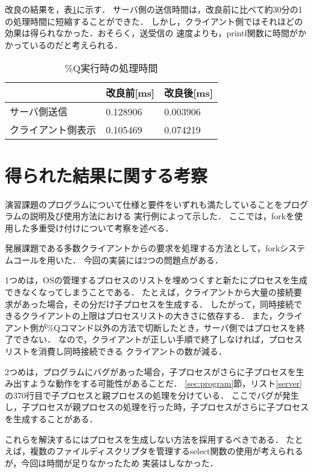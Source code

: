 \documentclass[11pt]{jarticle}
\begin{document}
改良の結果を，表\ref{table:Q}に示す．
サーバ側の送信時間は，改良前に比べて約30分の1の処理時間に短縮することができた．
しかし，クライアント側ではそれほどの効果は得られなかった．おそらく，送受信の
速度よりも，printf関数に時間がかかっているのだと考えられる．

\begin{table}[h] \caption{\%Q実行時の処理時間} \label{table:Q}
    \begin{center}
        \begin{tabular}{l|l|l} \hline
             & 改良前[ms] & 改良後[ms] \\ \hline \hline
            サーバ側送信 & 0.128906 & 0.003906 \\ 
            クライアント側表示 & 0.105469 & 0.074219 \\ 
        \end{tabular}
    \end{center}
\end{table}

\section{得られた結果に関する考察}

演習課題のプログラムについて仕様と要件をいずれも満たしていることをプログラムの説明及び使用方法における
実行例によって示した．
ここでは，forkを使用した多重受け付けについて考察を述べる．

発展課題である多数クライアントからの要求を処理する方法として，forkシステムコールを用いた．
今回の実装には2つの問題点がある．

1つめは，OSの管理するプロセスのリストを埋めつくすと新たにプロセスを生成できなくなってしまうことである．
たとえば，クライアントから大量の接続要求があった場合，その分だけ子プロセスを生成する．
したがって，同時接続できるクライアントの上限はプロセスリストの大きさに依存する．
また，クライアント側が\%Qコマンド以外の方法で切断したとき，サーバ側ではプロセスを終了できない．
なので，クライアントが正しい手順で終了しなければ，プロセスリストを消費し同時接続できる
クライアントの数が減る．

2つめは，プログラムにバグがあった場合，子プロセスがさらに子プロセスを生み出すような動作をする可能性があることだ．
\ref{sec:program}節，リスト\ref{server}の370行目で子プロセスと親プロセスの処理を分けている．
ここでバグが発生し，子プロセスが親プロセスの処理を行った時，子プロセスがさらに子プロセスを生成することがある．

これらを解決するにはプロセスを生成しない方法を採用するべきである．
たとえば，複数のファイルディスクリプタを管理するselect関数の使用が考えられるが，今回は時間が足りなかったため
実装はしなかった．
\end{document}
